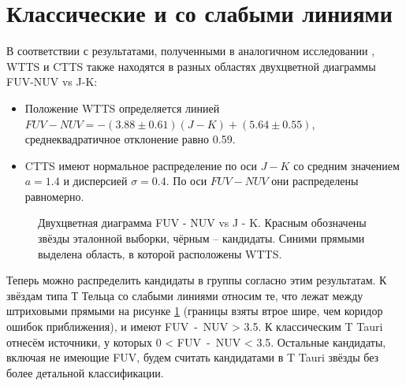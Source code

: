\section{Классические и со слабыми линиями}
В соответствии с результатами, полученными в аналогичном исследовании \cite{AIGdC2014galex}, WTTS и CTTS также находятся в разных областях двухцветной диаграммы FUV-NUV vs J-K:
\begin{itemize}
	\item Положение WTTS определяется линией $FUV - NUV = -(3.88 \pm 0.61)(J - K) + (5.64 \pm 0.55)$, среднеквадратичное отклонение равно 0.59.
	\item CTTS имеют нормальное распределение по оси $J - K$ со средним значением $a = 1.4$ и дисперсией $\sigma = 0.4$. По оси $FUV - NUV$ они распределены равномерно.
\end{itemize}

\begin{figure}[ht]
\hfill
\caption{Двухцветная диаграмма FUV - NUV vs J - K. Красным обозначены звёзды эталонной выборки, чёрным -- кандидаты. Синими прямыми выделена область, в которой расположены WTTS.}
\label{fig:trend}
\end{figure}

Теперь можно распределить кандидаты в группы согласно этим результатам. К звёздам типа Т Тельца со слабыми линиями относим те, что лежат между штриховыми прямыми на рисунке \ref{fig:trend} (границы взяты втрое шире, чем коридор ошибок приближения), и имеют FUV~-~NUV > 3.5. К классическим T Tauri отнесём источники, у которых 0 < FUV~-~NUV < 3.5. Остальные кандидаты, включая не имеющие FUV, будем считать кандидатами в T Tauri звёзды без более детальной классификации.



